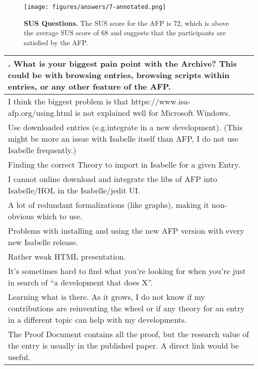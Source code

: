 \documentclass[bsc,frontabs,oneside,singlespacing,parskip,deptreport,logo]{infthesis}
\begin{document}
\begin{figure}[h!]
    \centering
    \texttt{[image: figures/answers/7-annotated.png]}
    \caption{\textbf{SUS Questions.} The SUS score for the AFP is 72, which is above the average SUS score of 68 and suggests that the participants are satisfied by the AFP\@.}
    \label{fig:sus}
    \medskip
\end{figure}

\begin{table}[h!]
\centering
{}
\begin{tabularx}{\textwidth}{X}
{\sf 8. What is your biggest pain point with the Archive? This could be with browsing entries, browsing scripts within entries, or any other feature of the AFP\@.}
\vspace{0.3cm}\\ 
\hline
\footnotesize
I think the biggest problem is that https://www.isa-afp.org/using.html is not explained well for Microsoft Windows.\\
\footnotesize
Use downloaded entries (e.g.integrate in a new development).  (This might be more an issue with Isabelle itself than AFP, I do not use Isabelle frequently.)\\
\footnotesize
Finding the correct Theory to import in Isabelle for a given Entry.\\
\footnotesize
I cannot online download and integrate the libs of AFP into Isabelle/HOL in the Isabelle/jedit UI.\\
\footnotesize
A lot of redundant formalizations (like graphs), making it non-obvious which to use.\\
\footnotesize
Problems with installing and using the new AFP version with every new Isabelle release.\\
\footnotesize
Rather weak HTML presentation.\\
\footnotesize
It's sometimes hard to find what you're looking for when you're just in search of ``a development that does X''.\\
\footnotesize
Learning what is there. As it grows, I do not know if my contributions are reinventing the wheel or if any theory for an entry in a different topic can help with my developments.\\
\footnotesize
The Proof Document contains all the proof, but the research value of the entry is usually in the published paper. A direct link would be useful.\\

\end{tabularx}
\end{table}
\end{document}
